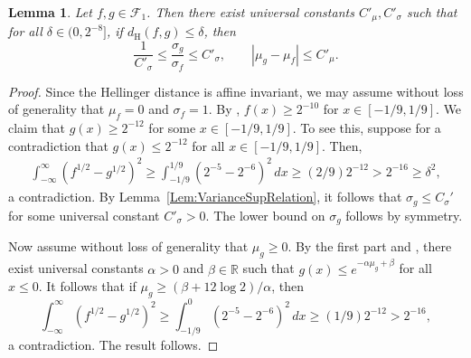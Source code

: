 \documentclass[a4paper,12pt]{article}
\newtheorem{lemma}[theorem]{Lemma}
\newcommand{\blue}[1]{{\color{blue}#1}}
\begin{document}
\begin{lemma}
  \label{Lem:HellingerMomentBound}
  Let $f, g \in \mathcal{F}_1$. Then there exist universal constants $C'_\mu, C'_\sigma$ such that for all $\delta \in (0, 2^{-8}]$, if $d_{\mathrm{H}}(f,g) \leq \delta$, then
  \[
    \frac{1}{C'_\sigma} \leq \frac{\sigma_g}{\sigma_f} \leq C'_\sigma,
    \qquad
    |\mu_g - \mu_f| \leq C'_\mu. 
  \]
\end{lemma}
\begin{proof}
Since the Hellinger distance is affine invariant, we may assume without loss of generality that $\mu_f = 0$ and $\sigma_f = 1$.  By \citet[][Theorem 5.14(d)]{lovasz2007geometry}, $f(x) \geq 2^{-10}$ for $x \in [-1/9, 1/9]$. We claim that $g(x) \geq 2^{-12}$ for some $x \in [-1/9, 1/9]$. To see this, suppose for a contradiction that $g(x) \leq 2^{-12}$ for all $x \in [-1/9, 1/9]$. Then,
  \begin{align*}
    \int_{-\infty}^\infty (f^{1/2} - g^{1/2})^2 \geq \int_{-1/9}^{1/9} ( 2^{-5} - 2^{-6} )^2 \, dx \geq (2/9) 2^{-12} > 2^{-16} \geq \delta^2,
  \end{align*}
a contradiction.  By Lemma~\ref{Lem:VarianceSupRelation}, it follows that $\sigma_g \leq C_\sigma'$ for some universal constant $C'_{\sigma} > 0$.  The lower bound on $\sigma_g$ follows by symmetry.

Now assume without loss of generality that $\mu_g \geq 0$.  By the first part and \citet[][Lemma~13]{fresen2013multivariate}, there exist universal constants $\alpha > 0$ and $\beta \in \mathbb{R}$ such that $g(x) \leq e^{- \alpha \mu_g + \beta}$ for all $x \leq 0$.  It follows that if $\mu_g \geq (\beta + 12\log 2)/\alpha$, then 
\[
\int_{-\infty}^\infty (f^{1/2} - g^{1/2})^2 \geq \int_{-1/9}^0 ( 2^{-5} - 2^{-6} )^2 \, dx \geq (1/9) 2^{-12} > 2^{-16},
\]
a contradiction.  The result follows.
\end{proof}
\end{document}
